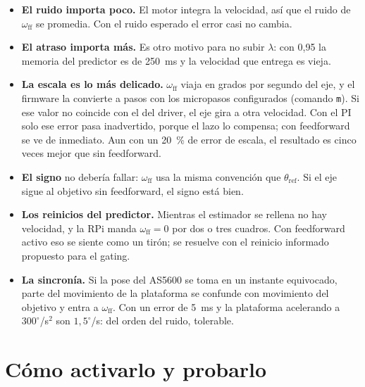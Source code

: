 \documentclass[11pt,a4paper]{article}
\newcommand{\cod}[1]{\texttt{#1}}
\newcommand{\lam}{\lambda}
\newcommand{\gr}{^{\circ}}
\begin{document}
\begin{itemize}
  \item \textbf{El ruido importa poco.} El motor integra la velocidad, así que el ruido de $\omega_{\mathrm{ff}}$
        se promedia. Con el ruido esperado el error casi no cambia.
  \item \textbf{El atraso importa más.} Es otro motivo para no subir $\lam$: con 0,95 la memoria del predictor es
        de 250~ms y la velocidad que entrega es vieja.
  \item \textbf{La escala es lo más delicado.} $\omega_{\mathrm{ff}}$ viaja en grados por segundo del eje, y el
        firmware la convierte a pasos con los micropasos configurados (comando \cod{m}). Si ese valor no coincide
        con el del driver, el eje gira a otra velocidad. Con el PI solo ese error pasa inadvertido, porque el lazo
        lo compensa; con feedforward se ve de inmediato. Aun con un 20~\% de error de escala, el resultado es
        cinco veces mejor que sin feedforward.
  \item \textbf{El signo} no debería fallar: $\omega_{\mathrm{ff}}$ usa la misma convención que
        $\theta_{\mathrm{ref}}$. Si el eje sigue al objetivo sin feedforward, el signo está bien.
  \item \textbf{Los reinicios del predictor.} Mientras el estimador se rellena no hay velocidad, y la RPi manda
        $\omega_{\mathrm{ff}} = 0$ por dos o tres cuadros. Con feedforward activo eso se siente como un tirón; se
        resuelve con el reinicio informado propuesto para el gating.
  \item \textbf{La sincronía.} Si la pose del AS5600 se toma en un instante equivocado, parte del movimiento de la
        plataforma se confunde con movimiento del objetivo y entra a $\omega_{\mathrm{ff}}$. Con un error de 5~ms y
        la plataforma acelerando a $300\gr$/s$^2$ son $1{,}5\gr$/s: del orden del ruido, tolerable.
\end{itemize}

\section{Cómo activarlo y probarlo}
\end{document}
